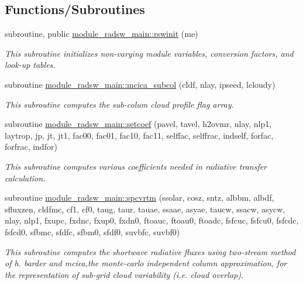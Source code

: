 \subsection*{Functions/\+Subroutines}
\begin{DoxyCompactItemize}
\item 
subroutine, public \hyperlink{group__module__radsw__main_ga5b0d35149515607d94f42b6ee5a40665}{module\+\_\+radsw\+\_\+main\+::rswinit} (me)
\begin{DoxyCompactList}\small\item\em This subroutine initializes non-\/varying module variables, conversion factors, and look-\/up tables. \end{DoxyCompactList}\item 
subroutine \hyperlink{group__module__radsw__main_gadf2f35094ed7dc31e8f52781745cf021}{module\+\_\+radsw\+\_\+main\+::mcica\+\_\+subcol} (cldf, nlay, ipseed, lcloudy)
\begin{DoxyCompactList}\small\item\em This subroutine computes the sub-\/colum cloud profile flag array. \end{DoxyCompactList}\item 
subroutine \hyperlink{group__module__radsw__main_ga5eb9918ebc222138a9dad016440e1a74}{module\+\_\+radsw\+\_\+main\+::setcoef} (pavel, tavel, h2ovmr, nlay, nlp1, laytrop, jp, jt, jt1, fac00, fac01, fac10, fac11, selffac, selffrac, indself, forfac, forfrac, indfor)
\begin{DoxyCompactList}\small\item\em This subroutine computes various coefficients needed in radiative transfer calculation. \end{DoxyCompactList}\item 
subroutine \hyperlink{group__module__radsw__main_ga859cc14063a58e9d0a252e4366b9fff3}{module\+\_\+radsw\+\_\+main\+::spcvrtm} (ssolar, cosz, sntz, albbm, albdf, sfluxzen, cldfmc, cf1, cf0, taug, taur, tauae, ssaae, asyae, taucw, ssacw, asycw, nlay, nlp1, fxupc, fxdnc, fxup0, fxdn0, ftoauc, ftoau0, ftoadc, fsfcuc, fsfcu0, fsfcdc, fsfcd0, sfbmc, sfdfc, sfbm0, sfdf0, suvbfc, suvbf0)
\begin{DoxyCompactList}\small\item\em This subroutine computes the shortwave radiative fluxes using two-\/stream method of h. barder and mcica,the monte-\/carlo independent column approximation, for the representation of sub-\/grid cloud variability (i.\+e. cloud overlap). \end{DoxyCompactList}\end{DoxyCompactItemize}
